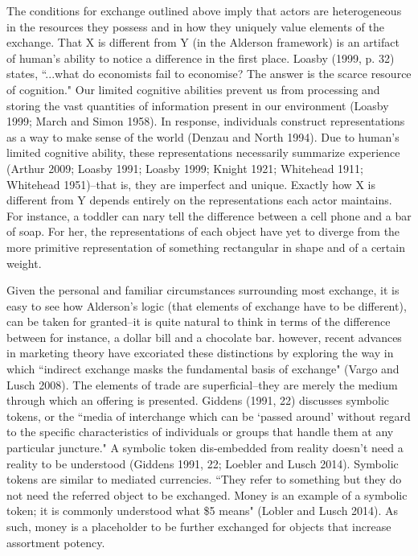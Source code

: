 The conditions for exchange outlined above imply that actors are heterogeneous in the resources they possess and in how they uniquely value elements of the exchange. That X is different from Y (in the Alderson framework) is an artifact of human's ability to notice a difference in the first place. Loasby (1999, p. 32) states, ``...what do economists fail to economise? The answer is the scarce resource of cognition." Our limited cognitive abilities prevent us from processing and storing the vast quantities of information present in our environment (Loasby 1999; March and Simon 1958). In response, individuals construct representations as a way to make sense of the world (Denzau and North 1994). Due to human's limited cognitive ability, these representations necessarily summarize experience (Arthur 2009; Loasby 1991; Loasby 1999; Knight 1921; Whitehead 1911; Whitehead 1951)--that is, they are imperfect and unique. Exactly how X is different from Y depends entirely on the representations each actor maintains. For instance, a toddler can nary tell the difference between a cell phone and a bar of soap. For her, the representations of each object have yet to diverge from the more primitive representation of something rectangular in shape and of a certain weight. 

Given the personal and familiar circumstances surrounding most exchange, it is easy to see how Alderson's logic (that elements of exchange have to be different), can be taken for granted--it is quite natural to think in terms of the difference between for instance, a dollar bill and a chocolate bar. however, recent advances in marketing theory have excoriated these distinctions by exploring the way in which ``indirect exchange masks the fundamental basis of exchange" (Vargo and Lusch 2008). The elements of trade are superficial--they are merely the medium through which an offering is presented. Giddens (1991, 22) discusses symbolic tokens, or the ``media of interchange which can be `passed around' without regard to the specific characteristics of individuals or groups that handle them at any particular juncture." A symbolic token dis-embedded from reality doesn't need a reality to be understood (Giddens 1991, 22; Loebler and Lusch 2014). Symbolic tokens are similar to mediated currencies. ``They refer to something but they do not need the referred object to be exchanged. Money is an example of a symbolic token; it is commonly understood what \$5 means" (Lobler and Lusch 2014). As such, money is a placeholder to be further exchanged for objects that increase assortment potency. 

